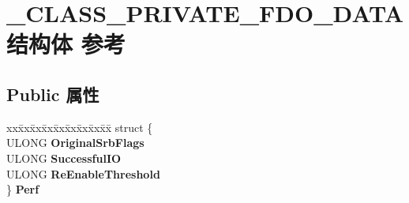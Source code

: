 \hypertarget{struct___c_l_a_s_s___p_r_i_v_a_t_e___f_d_o___d_a_t_a}{}\section{\+\_\+\+C\+L\+A\+S\+S\+\_\+\+P\+R\+I\+V\+A\+T\+E\+\_\+\+F\+D\+O\+\_\+\+D\+A\+T\+A结构体 参考}
\label{struct___c_l_a_s_s___p_r_i_v_a_t_e___f_d_o___d_a_t_a}
\subsection*{Public 属性}
\begin{DoxyCompactItemize}
\item 
\mbox{\label{struct___c_l_a_s_s___p_r_i_v_a_t_e___f_d_o___d_a_t_a_ad2203c6c84a567c7d5331033ab3c513b}} 
\begin{tabbing}
xx\=xx\=xx\=xx\=xx\=xx\=xx\=xx\=xx\=\kill
struct \{\\
\>ULONG {\bfseries OriginalSrbFlags}\\
\>ULONG {\bfseries SuccessfulIO}\\
\>ULONG {\bfseries ReEnableThreshold}\\
\} {\bfseries Perf}\\


\end{tabbing}
\end{DoxyCompactItemize}
